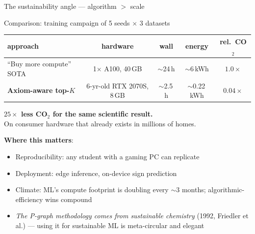 \documentclass[10pt,aspectratio=169]{beamer}
\begin{document}
\begin{frame}{The sustainability angle --- algorithm $>$ scale}

\begin{block}{Comparison: training campaign of 5 seeds $\times$ 3 datasets}
\centering
\begin{tabular}{l c c c c}
\toprule
approach & hardware & wall & energy & rel.\ CO$_2$ \\
\midrule
``Buy more compute'' SOTA       & 1$\times$ A100, 40\,GB & $\sim$24\,h & $\sim$6\,kWh & $1.0\times$ \\
\textbf{Axiom-aware top-$K$}    & 6-yr-old RTX 2070S, 8\,GB & $\sim$2.5\,h & $\sim$0.22\,kWh & $\boldsymbol{0.04\times}$ \\
\bottomrule
\end{tabular}
\end{block}

\medskip
\textbf{$25\times$ less CO$_2$ for the same scientific result.}\\
On consumer hardware that already exists in millions of homes.

\medskip
\textbf{Where this matters}:
\begin{itemize}
\item Reproducibility: any student with a gaming PC can replicate
\item Deployment: edge inference, on-device sign prediction
\item Climate: ML's compute footprint is doubling every $\sim$3
      months; algorithmic-efficiency wins compound
\item \emph{The P-graph methodology comes from sustainable chemistry}
      (1992, Friedler et al.) --- using it for sustainable ML is
      meta-circular and elegant
\end{itemize}
\end{frame}
\end{document}
